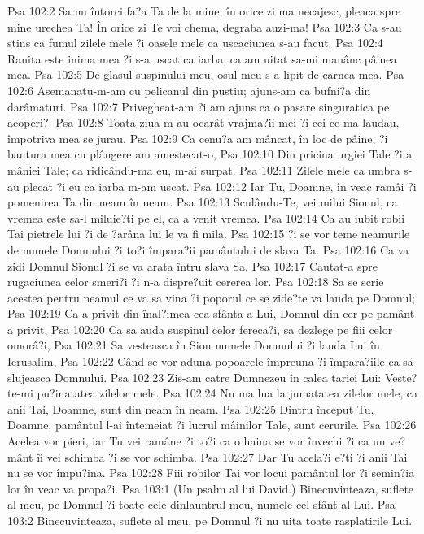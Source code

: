Psa 102:2  Sa nu întorci fa?a Ta de la mine; în orice zi ma necajesc, pleaca spre mine urechea Ta! În orice zi Te voi chema, degraba auzi-ma!
Psa 102:3  Ca s-au stins ca fumul zilele mele ?i oasele mele ca uscaciunea s-au facut.
Psa 102:4  Ranita este inima mea ?i s-a uscat ca iarba; ca am uitat sa-mi manânc pâinea mea.
Psa 102:5  De glasul suspinului meu, osul meu s-a lipit de carnea mea.
Psa 102:6  Asemanatu-m-am cu pelicanul din pustiu; ajuns-am ca bufni?a din darâmaturi.
Psa 102:7  Privegheat-am ?i am ajuns ca o pasare singuratica pe acoperi?.
Psa 102:8  Toata ziua m-au ocarât vrajma?ii mei ?i cei ce ma laudau, împotriva mea se jurau.
Psa 102:9  Ca cenu?a am mâncat, în loc de pâine, ?i bautura mea cu plângere am amestecat-o,
Psa 102:10  Din pricina urgiei Tale ?i a mâniei Tale; ca ridicându-ma eu, m-ai surpat.
Psa 102:11  Zilele mele ca umbra s-au plecat ?i eu ca iarba m-am uscat.
Psa 102:12  Iar Tu, Doamne, în veac ramâi ?i pomenirea Ta din neam în neam.
Psa 102:13  Sculându-Te, vei milui Sionul, ca vremea este sa-l miluie?ti pe el, ca a venit vremea.
Psa 102:14  Ca au iubit robii Tai pietrele lui ?i de ?arâna lui le va fi mila.
Psa 102:15  ?i se vor teme neamurile de numele Domnului ?i to?i împara?ii pamântului de slava Ta.
Psa 102:16  Ca va zidi Domnul Sionul ?i se va arata întru slava Sa.
Psa 102:17  Cautat-a spre rugaciunea celor smeri?i ?i n-a dispre?uit cererea lor.
Psa 102:18  Sa se scrie acestea pentru neamul ce va sa vina ?i poporul ce se zide?te va lauda pe Domnul;
Psa 102:19  Ca a privit din înal?imea cea sfânta a Lui, Domnul din cer pe pamânt a privit,
Psa 102:20  Ca sa auda suspinul celor fereca?i, sa dezlege pe fiii celor omorâ?i,
Psa 102:21  Sa vesteasca în Sion numele Domnului ?i lauda Lui în Ierusalim,
Psa 102:22  Când se vor aduna popoarele împreuna ?i împara?iile ca sa slujeasca Domnului.
Psa 102:23  Zis-am catre Dumnezeu în calea tariei Lui: Veste?te-mi pu?inatatea zilelor mele.
Psa 102:24  Nu ma lua la jumatatea zilelor mele, ca anii Tai, Doamne, sunt din neam în neam.
Psa 102:25  Dintru început Tu, Doamne, pamântul l-ai întemeiat ?i lucrul mâinilor Tale, sunt cerurile.
Psa 102:26  Acelea vor pieri, iar Tu vei ramâne ?i to?i ca o haina se vor învechi ?i ca un ve?mânt îi vei schimba ?i se vor schimba.
Psa 102:27  Dar Tu acela?i e?ti ?i anii Tai nu se vor împu?ina.
Psa 102:28  Fiii robilor Tai vor locui pamântul lor ?i semin?ia lor în veac va propa?i.
Psa 103:1  (Un psalm al lui David.) Binecuvinteaza, suflete al meu, pe Domnul ?i toate cele dinlauntrul meu, numele cel sfânt al Lui.
Psa 103:2  Binecuvinteaza, suflete al meu, pe Domnul ?i nu uita toate rasplatirile Lui.

